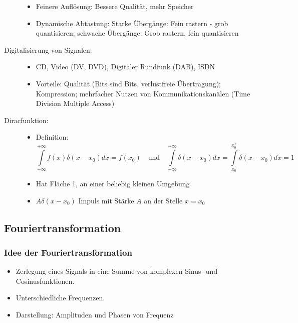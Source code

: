 \begin{description}
\begin{itemize}
\item Feinere Auflösung: Bessere Qualität, mehr Speicher
\item Dynamische Abtastung: Starke Übergänge: Fein rastern - grob quantisieren; schwache Übergänge: Grob rastern, fein quantisieren
\end{itemize}
\item[Digitalisierung von Signalen:] \quad
\begin{itemize}
\item CD, Video (DV, DVD), Digitaler Rundfunk (DAB), ISDN
\item Vorteile: Qualität (Bits sind Bits, verlustfreie Übertragung); Kompression; mehrfacher Nutzen von Kommunikationskanälen (Time Division Multiple Access)
\end{itemize}
\item[Diracfunktion\index{Diracfunktion}:]\quad
\begin{itemize}
\item Definition: $$\int\limits_{- \infty}^{+ \infty} f(x) \delta(x - x_0) dx = f(x_0) \quad \textrm{und} \quad \int\limits_{- \infty}^{+ \infty} \delta(x - x_0) dx = \int\limits_{x_0^-}^{x_0^+} \delta(x - x_0) dx = 1$$
\item Hat Fläche 1, an einer beliebig kleinen Umgebung
\item $A \delta(x - x_0)$ Impuls mit Stärke $A$ an der Stelle $x = x_0$
\end{itemize}
\end{description}

\subsection{Fouriertransformation}

\subsubsection*{Idee der Fouriertransformation}
\begin{itemize}
\item Zerlegung eines Signals in eine Summe von komplexen Sinus- und Cosinusfunktionen.
\item Unterschiedliche Frequenzen.
\item Darstellung: Amplituden und Phasen von Frequenz
\end{itemize}

